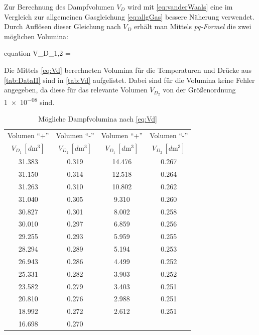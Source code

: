 	Zur Berechnung des Dampfvolumen $V_{D}$ wird mit \eqref{eq:vanderWaals} eine im Vergleich zur allgemeinen Gasgleichung
	\eqref{eq:allgGas} bessere Näherung verwendet. Durch Auflösen dieser Gleichung nach $V_{D}$ erhält man Mittels \emph{pq-Formel} 
	die zwei möglichen Volumina:
	\begin{empheq}{equation}
		V_{D_{1,2}} =  \pm {}
		\label{eq:Vd}
	\end{empheq} 
	Die Mittels \eqref{eq:Vd} berechneten Volumina für die Temperaturen und Drücke aus \autoref{tab:DataII} sind in \autoref{tab:Vd}
	aufgelistet. Dabei sind für die Volumina keine Fehler angegeben, da diese für das relevante Volumen $V_{D_{2}}$ von der Größenordnung
	\num{1e-08} sind.
	
	\begin{table}[!h]
		\centering
		\begin{tabular}{|c|c||c|c|}
			\hline
			Volumen \enquote{+} & Volumen \enquote{-} & Volumen \enquote{+} & Volumen \enquote{-}\\
			$V_{D_{1}}\,[\si{d\meter\cubed}]$  & $V_{D_{2}}\,[\si{d\meter\cubed}]$ & $V_{D_{1}}\,[\si{d\meter\cubed}]$  & $V_{D_{2}}\,[\si{d\meter\cubed}]$ \\ \hline\hline
			\num{31.383}  & \num{0.319} & \num{14.476}  & \num{0.267} \\
			\num{31.150}  & \num{0.314} &\num{12.518}  & \num{0.264} \\
			\num{31.263}  & \num{0.310} &\num{10.802}  & \num{0.262} \\
			\num{31.040}  & \num{0.305} &\num{9.310}  & \num{0.260} \\
			\num{30.827}  & \num{0.301} &\num{8.002}  & \num{0.258} \\
			\num{30.010}  & \num{0.297} &\num{6.859}  & \num{0.256} \\
			\num{29.255}  & \num{0.293} &\num{5.959}  & \num{0.255} \\
			\num{28.294}  & \num{0.289} &\num{5.194}  & \num{0.253} \\
			\num{26.943}  & \num{0.286} &\num{4.499}  & \num{0.252} \\
			\num{25.331}  & \num{0.282} &\num{3.903}  & \num{0.252} \\
			\num{23.582}  & \num{0.279} &\num{3.403}  & \num{0.251} \\
			\num{20.810}  & \num{0.276} &\num{2.988}  & \num{0.251} \\
			\num{18.992}  & \num{0.272} &\num{2.612}  & \num{0.251} \\
			\num{16.698}  & \num{0.270} & & \\
			\hline
		\end{tabular}
		\caption{Mögliche Dampfvolumina nach \eqref{eq:Vd} \label{tab:Vd}}
	\end{table}
	
